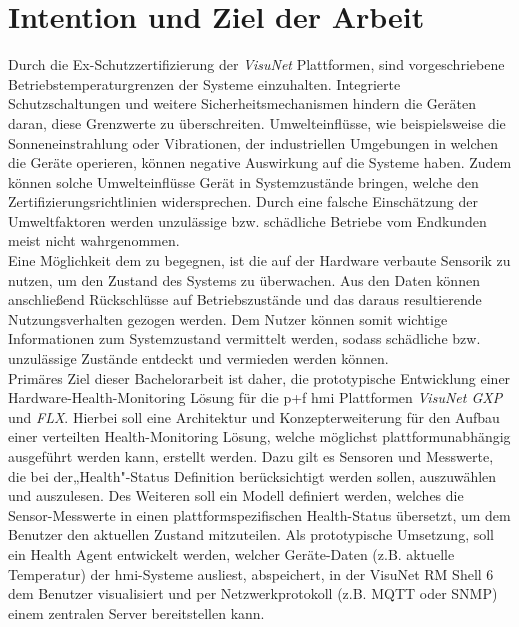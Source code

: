 \section{Intention und Ziel der Arbeit}\label{sec:IZA}
Durch die Ex-Schutzzertifizierung der \textit{VisuNet} Plattformen, sind vorgeschriebene Betriebstemperaturgrenzen der Systeme einzuhalten. Integrierte Schutzschaltungen und weitere Sicherheitsmechanismen hindern die Geräten daran, diese Grenzwerte zu überschreiten. Umwelteinflüsse, wie beispielsweise die Sonneneinstrahlung oder Vibrationen, der industriellen Umgebungen in welchen die Geräte operieren, können negative Auswirkung auf die Systeme haben. Zudem können solche Umwelteinflüsse Gerät in Systemzustände bringen, welche den Zertifizierungsrichtlinien widersprechen. Durch eine falsche Einschätzung der Umweltfaktoren werden unzulässige bzw. schädliche Betriebe vom Endkunden meist nicht wahrgenommen.\\
Eine Möglichkeit dem zu begegnen, ist die auf der Hardware verbaute Sensorik zu nutzen, um den Zustand des Systems zu überwachen. Aus den Daten können anschließend Rückschlüsse auf Betriebszustände und das daraus resultierende Nutzungsverhalten gezogen werden. Dem Nutzer können somit wichtige Informationen zum Systemzustand vermittelt werden, sodass schädliche bzw. unzulässige Zustände entdeckt und vermieden werden können.\\
Primäres Ziel dieser Bachelorarbeit ist daher, die prototypische Entwicklung einer Hardware-Health-Monitoring Lösung für die \ac{p+f} \ac{hmi} Plattformen \textit{VisuNet GXP} und \textit{FLX}. Hierbei soll eine Architektur und Konzepterweiterung für den Aufbau einer verteilten Health-Monitoring Lösung, welche möglichst plattformunabhängig ausgeführt werden kann, erstellt werden. Dazu gilt es Sensoren und Messwerte, die bei der„Health"-Status Definition berücksichtigt werden sollen, auszuwählen und auszulesen. Des Weiteren soll ein Modell definiert werden, welches die Sensor-Messwerte in einen plattformspezifischen Health-Status übersetzt, um dem Benutzer den aktuellen Zustand mitzuteilen. Als prototypische Umsetzung, soll ein Health Agent entwickelt werden, welcher Geräte-Daten (z.B. aktuelle Temperatur) der \ac{hmi}-Systeme ausliest, abspeichert, in der VisuNet RM Shell 6 dem Benutzer visualisiert und per Netzwerkprotokoll (z.B. MQTT oder SNMP) einem zentralen Server bereitstellen kann.    

